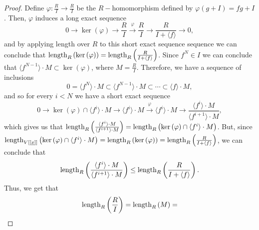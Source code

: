 \documentclass{article}
\newcommand{\Vx}{V[[\underline{x}]]}
\numberwithin{theorem}{section}
\begin{document}
\begin{proof}
    Define $\varphi \colon \frac{R}{I} \to \frac{R}{I}$ be the $R-$homomorphism defined by $\varphi(g + I) = fg + I$. Then, $\varphi$ induces a long exact sequence 
    \begin{equation*}
        0 \to \ker\left(\varphi\right) \to \frac{R}{I} \xrightarrow{\varphi} \frac{R}{I}  \to \frac{R}{I + \langle f \rangle} \to 0,
    \end{equation*}
    and by applying length over $R$ to this short exact sequence sequence we can conclude that $\textup{length}_{R}\left(\ker\left(\varphi\right)\right) = \textup{length}_{R}\left(\frac{R}{I + \langle f \rangle}\right)$. Since $f^N \in I$ we can conclude that $\langle f^{N-1} \rangle \cdot M \subset \ker\left(\varphi\right)$, where $M= \frac{R}{I}$. Therefore, we have a sequence of inclusions
    \begin{equation*}
        0 = \langle f^N \rangle \cdot  M \subset \langle f^{N-1} \rangle \cdot M \subset \cdots \subset \langle f \rangle \cdot M,
    \end{equation*}
    and so for every $i < N$ we have a short exact sequence 
    \begin{equation*}
        0 \to \ker\left(\varphi\right) \cap \langle f^i \rangle \cdot M \to \langle f^i \rangle \cdot M \xrightarrow{\varphi} \langle f^i \rangle \cdot M \to \frac{\langle f^i \rangle \cdot M }{ \langle f^{i+1} \rangle \cdot M },
    \end{equation*}
     which gives us that $\textup{length}_{R}\left(\frac{\langle f^i \rangle \cdot M }{ \langle f^{i+1} \rangle \cdot M }\right) = \textup{length}_{R}\left(\ker\left(\varphi\right) \cap \langle f^i \rangle \cdot M\right)$. But, since $\textup{length}_{\Vx}\left(\ker\left(\varphi\right) \cap \langle f^i \rangle \cdot M\right) =\textup{length}_{R}\left(\ker\left(\varphi\right)\right) = \textup{length}_{R}\left(\frac{R}{I + \langle f \rangle}\right)$, we can conclude that 
     \begin{equation*}
     \textup{length}_{R}\left(\frac{\langle f^i \rangle \cdot M }{ \langle f^{i+1} \rangle \cdot M }\right) \leq \textup{length}_{R}\left(\frac{R}{I + \langle f \rangle}\right). 
     \end{equation*} 
    \noindent Thus, we get that 
    \begin{equation*}
    \begin{split}
        \textup{length}_{R}\left(\frac{R}{I}\right) &=\textup{length}_R\left(M\right)=\\

\end{split}
\end{equation*}
\end{proof}
\end{document}

